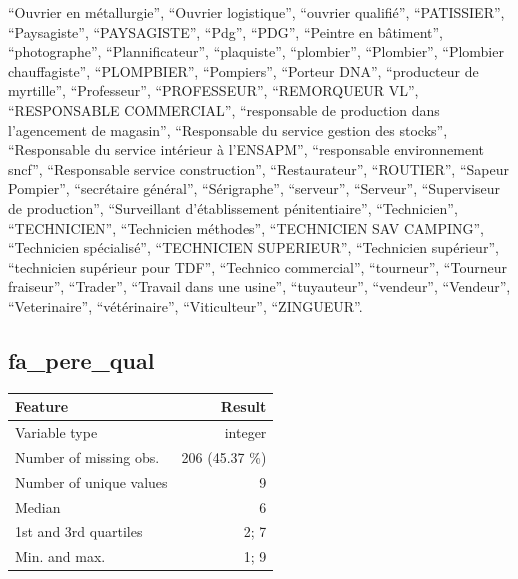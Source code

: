 \documentclass[
  letterpaper,
  DIV=11,
  numbers=noendperiod]{scrartcl}
\begin{document}
\begin{itemize}
  ``Ouvrier en métallurgie'', ``Ouvrier logistique'', ``ouvrier
  qualifié'', ``PATISSIER'', ``Paysagiste'', ``PAYSAGISTE'', ``Pdg'',
  ``PDG'', ``Peintre en bâtiment'', ``photographe'', ``Plannificateur'',
  ``plaquiste'', ``plombier'', ``Plombier'', ``Plombier chauffagiste'',
  ``PLOMPBIER'', ``Pompiers'', ``Porteur DNA'', ``producteur de
  myrtille'', ``Professeur'', ``PROFESSEUR'', ``REMORQUEUR VL'',
  ``RESPONSABLE COMMERCIAL'', ``responsable de production dans
  l'agencement de magasin'', ``Responsable du service gestion des
  stocks'', ``Responsable du service intérieur à l'ENSAPM'',
  ``responsable environnement sncf'', ``Responsable service
  construction'', ``Restaurateur'', ``ROUTIER'', ``Sapeur Pompier'',
  ``secrétaire général'', ``Sérigraphe'', ``serveur'', ``Serveur'',
  ``Superviseur de production'', ``Surveillant d'établissement
  pénitentiaire'', ``Technicien'', ``TECHNICIEN'', ``Technicien
  méthodes'', ``TECHNICIEN SAV CAMPING'', ``Technicien spécialisé'',
  ``TECHNICIEN SUPERIEUR'', ``Technicien supérieur'', ``technicien
  supérieur pour TDF'', ``Technico commercial'', ``tourneur'',
  ``Tourneur fraiseur'', ``Trader'', ``Travail dans une usine'',
  ``tuyauteur'', ``vendeur'', ``Vendeur'', ``Veterinaire'',
  ``vétérinaire'', ``Viticulteur'', ``ZINGUEUR''.
\end{itemize}

\fullline

\subsection{fa\_pere\_qual}\label{fa_pere_qual}

\bminione

\begin{longtable}[]{@{}lr@{}}
\toprule\noalign{}
Feature & Result \\
\midrule\noalign{}
\endhead
\bottomrule\noalign{}
\endlastfoot
Variable type & integer \\
Number of missing obs. & 206 (45.37 \%) \\
Number of unique values & 9 \\
Median & 6 \\
1st and 3rd quartiles & 2; 7 \\
Min. and max. & 1; 9 \\
\end{longtable}

\emini
\bminitwo
\end{document}
